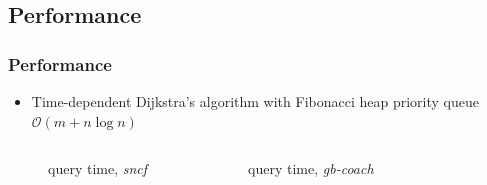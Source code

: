 \documentclass[]{beamer}
\newcommand{\inputTikZ}[1]{%
  }
\newcommand{\inputTikZ}[1]{%
    \beginpgfgraphicnamed{#1-external}%
    \endpgfgraphicnamed%
  }
\begin{document}
        \subsection{Performance}
        \begin{frame}
            \frametitle{Performance}
            \begin{itemize}
            	\item Time-dependent Dijkstra's algorithm with Fibonacci heap priority queue $\mathcal{O}(m + n \log n)$
            \end{itemize}
			\begin{columns}[c]
            \column{2.4in}
				\begin{figure}[h]
					\scriptsize
	                \begin{center}
	                    \inputTikZ{./tikzpics/plot_usporall_sncf_size}
	                \end{center}
	                \caption{\footnotesize query time, \textit{sncf}}
	            \end{figure}
	        \column{2.4in}
	        	\begin{figure}[h]
					\scriptsize
	                \begin{center}
	                    \inputTikZ{./tikzpics/plot_usporall_gbcoach_size}
	                \end{center}
	                \caption{\footnotesize query time, \textit{gb-coach}}
	            \end{figure}
	        \end{columns}
        \end{frame}
        
        
\end{document}

